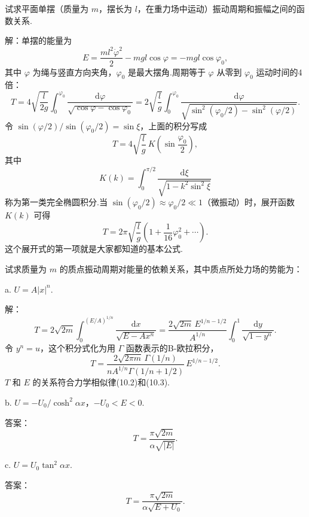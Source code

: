 \begin{xiti}

\quad 试求平面单摆（质量为 $m$，摆长为 $l$，在重力场中运动）振动周期和振幅之间的函数关系.

解：单摆的能量为
\begin{equation*}
  E=\frac{ml^2\dot{\varphi}^2}{2}-mgl\cos\varphi
  =-mgl\cos\varphi_0,
\end{equation*}
其中 $\varphi$ 为绳与竖直方向夹角，$\varphi_0$ 是最大摆角.周期等于 $\varphi$ 从零到 $\varphi_0$ 运动时间的4倍：
\begin{equation*}
  T=4\sqrt{\frac{l}{2g}}\int_0^{\varphi_0}
  \frac{\mathrm{d}\varphi}{\sqrt{\cos\varphi-\cos\varphi_0}}
  =2\sqrt{\frac{l}{g}}\int_0^{\varphi_0}
  \frac{\mathrm{d}\varphi}
  {\sqrt{\sin^2(\varphi_0/2)-\sin^2(\varphi/2)}}.
\end{equation*}
令 $\sin(\varphi/2)/\sin(\varphi_0/2)=\sin\xi$，上面的积分写成
\begin{equation*}
  T=4\sqrt{\frac{l}{g}}\,K\left(\sin\frac{\varphi_0}{2}\right),
\end{equation*}
其中
\begin{equation*}
  K(k)=\int_0^{\pi/2}\frac{\mathrm{d}\xi}
  {\sqrt{1-k^2\sin^2\xi}}
\end{equation*}
称为第一类完全椭圆积分.当 $\sin(\varphi_0/2)\approx\varphi_0/2\ll1$（微振动）时，展开函数 $K(k)$ 可得
\begin{equation*}
  T=2\pi\sqrt{\frac{l}{g}}
  \left(1+\frac{1}{16}\varphi_0^2+\cdots\right).
\end{equation*}
这个展开式的第一项就是大家都知道的基本公式.

\quad 试求质量为 $m$ 的质点振动周期对能量的依赖关系，其中质点所处力场的势能为：

a. $U=A|x|^n$.

解：
\begin{equation*}
  T=2\sqrt{2m}\int_0^{(E/A)^{1/n}}
  \frac{\mathrm{d}x}{\sqrt{E-Ax^n}}
  =\frac{2\sqrt{2m}\,E^{1/n-1/2}}{A^{1/n}}
  \int_0^1\frac{\mathrm{d}y}{\sqrt{1-y^n}}.
\end{equation*}
令 $y^n=u$，这个积分式化为用 $\Gamma$ 函数表示的B-欧拉积分，
\begin{equation*}
  T=\frac{2\sqrt{2\pi m}\,\Gamma(1/n)}
  {nA^{1/n}\Gamma(1/n+1/2)}\,E^{1/n-1/2}.
\end{equation*}
$T$ 和 $E$ 的关系符合力学相似律(10.2)和(10.3).

b. $U=-U_0/\cosh^2\alpha x$，$-U_0<E<0$.

答案：
\begin{equation*}
  T=\frac{\pi\sqrt{2m}}{\alpha\sqrt{|E|}}.
\end{equation*}

c. $U=U_0\tan^2\alpha x$.

答案：
\begin{equation*}
  T=\frac{\pi\sqrt{2m}}{\alpha\sqrt{E+U_0}}.
\end{equation*}

\end{xiti}

